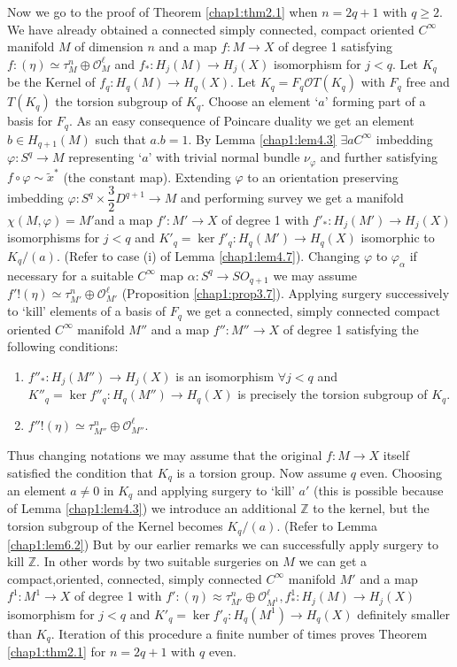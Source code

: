 Now we go to the proof of Theorem \ref{chap1:thm2.1} when $n = 2q +1$ with $q \geq
2$. We have already obtained a connected simply connected, compact
oriented $C^\infty$ manifold $M$ of dimension $n$ and a map $f : M \to
X$ of degree 1 satisfying $f : (\eta) \simeq \tau ^n _M \oplus
\mathscr{O}_M^\ell$ and $f_* : H_j (M) \to H_j (X)$ isomorphism for $j
< q$. Let $K_q$ be the Kernel of $f_q : H_q (M) \to H_q (X)$. Let $K_q
= F_q \mathscr{O} T( K_q)$ with $F_q$ free and $T(K_q)$ the torsion
subgroup of $K_q$. Choose an element `$a$' forming part of a basis for
$F_q$. As an easy consequence of Poincare duality we get an element $b
\in H_{q+1} (M)$ such that $a . b =1$. By Lemma \ref{chap1:lem4.3} $\exists a
C^\infty$ imbedding $\varphi : S^q \to M$ representing `$a$' with
trivial normal bundle $\nu_\varphi$ and further satisfying $f \circ
\varphi \sim \tilde{x}^*$ (the constant map). Extending $\varphi$ to
an orientation preserving imbedding $\varphi : S^q \times
\dfrac{3}{2} D^{q+1} \to M$ and performing survey we get a manifold
$\chi (M, \varphi) = M'$\pageoriginale and a map $f' : M' \to X$ of
degree 1 with 
$f'_* : H_j (M') \to H_j (X)$ isomorphisms for $j < q$ and $K'_q =
\ker f'_q : H_q (M') \to H_q (X)$ isomorphic to $K_q / (a)$. (Refer to
case  (i) of Lemma \ref{chap1:lem4.7}). Changing $\varphi$ to $\varphi_\alpha$ if
necessary for a suitable $C^\infty$ map $\alpha :  S^q \to SO_{q+1}$
we may assume $f' ! (\eta ) \simeq \tau^n _{M'} \oplus
\mathscr{O}_{M'}^\ell$ (Proposition \ref{chap1:prop3.7}). Applying surgery successively
to `kill' elements of a basis of $F_q$ we get a connected, simply
connected compact oriented $C^\infty$ manifold $M''$ and a map $f'' :
M'' \to X$ of degree 1 satisfying the following conditions:  
\begin{enumerate}[1)]
\item $f''_* : H_j (M'') \to H_j (X)$ is an isomorphism $\forall j <q$
  and $K''_q = \ker f''_q : H_q (M'') \to H_q (X)$ is precisely the
  torsion subgroup of $K_q$.  

\item $f'' ! (\eta ) \simeq \tau^n _{M''} \oplus
  \mathscr{O}_{M''}^\ell$. 
\end{enumerate}
Thus changing notations we may assume that the original $f : M \to X$
itself satisfied the condition that $K_q$ is a torsion group. Now
assume $q$ even. Choosing an element $a \neq 0$ in $K_q$ and applying
surgery to `kill' $a'$ (this is possible because of Lemma  \ref{chap1:lem4.3}) we
introduce an additional $\mathbb{Z}$ to the kernel, but the torsion
subgroup of the Kernel becomes $K_q / (a)$. (Refer to Lemma \ref{chap1:lem6.2}) But
by our earlier remarks we can successfully apply surgery to kill
$\mathbb{Z}$. In other words by two suitable surgeries on $M$ we can
get a compact,\pageoriginale oriented, connected, simply connected
$C^\infty$ 
manifold $M'$ and a map $f^1 :  M^1 \to X$ of degree 1 with $f' :
(\eta) \approx \tau^n_{M'} \oplus \mathscr{O}_{M^1}^\ell, f^1_* : H_j
(M)  \to  H_j (X)$ isomorphism for $j < q$ and $K'_q = \ker f'_q  :
H_q (M^1) \to H_q (X)$ definitely smaller than $ K_q$. Iteration of
this procedure a finite number of times proves Theorem \ref{chap1:thm2.1} for $n = 2q
+1$ with $q$ even. 


